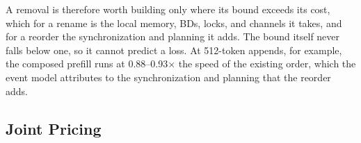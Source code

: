 A removal is therefore worth building only where its bound exceeds its cost, which for a rename is the local memory, BDs, locks, and channels it takes, and for a reorder the synchronization and planning it adds.
The bound itself never falls below one, so it cannot predict a loss.
At 512-token appends, for example, the composed prefill runs at 0.88--0.93$\times$ the speed of the existing order, which the event model attributes to the synchronization and planning that the reorder adds.

\subsection{Joint Pricing}
\label{subsec:joint}

